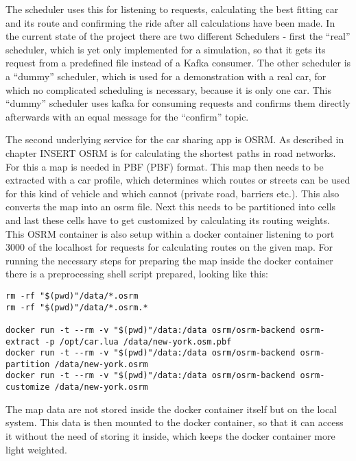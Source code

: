 The scheduler uses this for listening to requests, calculating the best fitting car and its route and confirming the ride after all calculations have been made. In the current state of the project there are two different Schedulers - first the ``real'' scheduler, which is yet only implemented for a simulation, so that it gets its request from a predefined file instead of a Kafka consumer. The other scheduler is a ``dummy'' scheduler, which is used for a demonstration with a real car, for which no complicated scheduling is necessary, because it is only one car. This ``dummy'' scheduler uses kafka for consuming requests and confirms them directly afterwards with an equal message for the ``confirm'' topic.


The second underlying service for the car sharing app is OSRM. As described in chapter INSERT OSRM is for calculating the shortest paths in road networks. For this a map is needed in \acs{PBF} (\acl{PBF}) format. This map then needs to be extracted with a car profile, which determines which routes or streets can be used for this kind of vehicle and which cannot (private road, barriers etc.). This also converts the map into an osrm file. Next this needs to be partitioned into cells and last these cells have to get customized by calculating its routing weights. This OSRM container is also setup within a docker container listening to port 3000 of the localhost for requests for calculating routes on the given map. For running the necessary steps for preparing the map inside the docker container there is a preprocessing shell script prepared, looking like this:


\begin{lstlisting}
rm -rf "$(pwd)"/data/*.osrm
rm -rf "$(pwd)"/data/*.osrm.*

docker run -t --rm -v "$(pwd)"/data:/data osrm/osrm-backend osrm-extract -p /opt/car.lua /data/new-york.osm.pbf
docker run -t --rm -v "$(pwd)"/data:/data osrm/osrm-backend osrm-partition /data/new-york.osrm
docker run -t --rm -v "$(pwd)"/data:/data osrm/osrm-backend osrm-customize /data/new-york.osrm
\end{lstlisting}

The map data are not stored inside the docker container itself but on the local system. This data is then mounted to the docker container, so that it can access it without the need of storing it inside, which keeps the docker container more light weighted.

